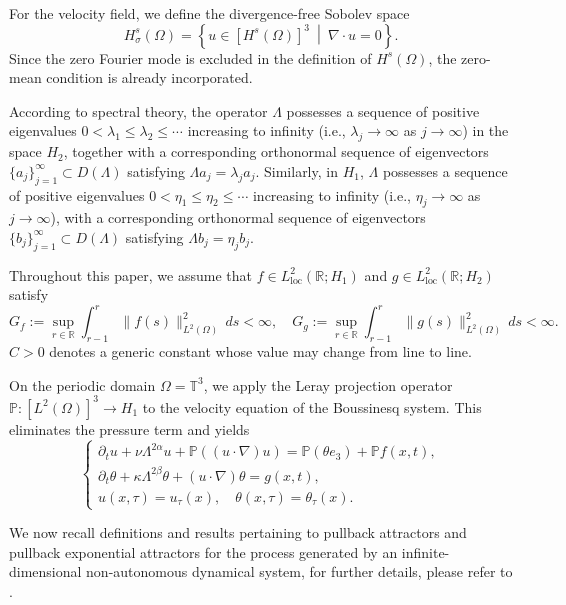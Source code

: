 \documentclass[oneside,preprint,12pt,numbers,sort&compress]{elsarticle}
\begin{document}
For the velocity field, we define the divergence-free Sobolev space
\[
H_\sigma^s(\Omega)
=
\left\{
u\in [H^s(\Omega)]^3
\ \middle|\
\nabla\cdot u=0
\right\}.
\]
Since the zero Fourier mode is excluded in the definition of $H^s(\Omega)$, the zero-mean condition is already incorporated. 

According to spectral theory, the operator $\Lambda$ possesses a sequence of positive eigenvalues \(0 < \lambda_1 \leq \lambda_2 \leq \cdots\) increasing to infinity (i.e., $\lambda_j \to \infty$ as $j \to \infty$) in the space $H_{2}$, together with a corresponding orthonormal sequence of eigenvectors $\{a_j\}_{j=1}^{\infty} \subset D(\Lambda)$ satisfying $\Lambda a_j = \lambda_j a_j$. Similarly, in $H_{1}$, $\Lambda$ possesses a sequence of positive eigenvalues \(0 < \eta_1 \leq \eta_2 \leq \cdots\) increasing to infinity (i.e., $\eta_j \to \infty$ as $j \to \infty$), with a corresponding orthonormal sequence of eigenvectors $\{b_j\}_{j=1}^{\infty} \subset D(\Lambda)$ satisfying $\Lambda b_j = \eta_j b_j$.

Throughout this paper, we assume that
$f\in L^2_{\mathrm{loc}}(\mathbb{R};H_1)$ and
$g\in L^2_{\mathrm{loc}}(\mathbb{R};H_2)$ satisfy
\begin{equation}\label{ass:forcing}
G_f := \sup_{r\in\mathbb{R}}
\int_{r-1}^{r}\|f(s)\|_{L^2(\Omega)}^2\,ds < \infty, \quad
G_g := \sup_{r\in\mathbb{R}}
\int_{r-1}^{r}\|g(s)\|_{L^2(\Omega)}^2\,ds < \infty.
\end{equation}
$C>0$ denotes a generic constant whose value may change from line to line. 

On the periodic domain $\Omega = \mathbb{T}^3$, we apply the Leray projection operator $\mathbb{P}:[L^2(\Omega)]^{3}\to H_{1}$ to the velocity equation of the Boussinesq system. This eliminates the pressure term and yields
\begin{equation}\label{eq0201}
\begin{cases}
\partial_t u + \nu \Lambda^{2\alpha} u + \mathbb{P} \left( (u \cdot \nabla) u \right) = \mathbb{P} (\theta e_3) + \mathbb{P} f(x,t), \\
\partial_t \theta + \kappa \Lambda^{2\beta} \theta + (u \cdot \nabla) \theta = g(x,t), \\
u(x,\tau) = u_\tau(x), \quad \theta(x,\tau) = \theta_\tau(x).
\end{cases}
\end{equation} 

We now recall definitions and results pertaining to pullback attractors and pullback exponential attractors for the process generated by an inﬁnite-dimensional non-autonomous dynamical system, for further details, please refer to \cite{CLR2013,CV2002,Ha1988}.
\end{document}
